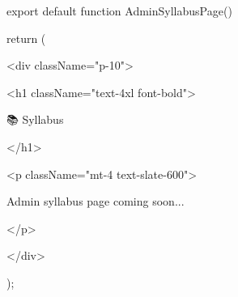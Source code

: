 export default function AdminSyllabusPage() {
  return (

    <div className="p-10">

      <h1 className="text-4xl font-bold">

        📚 Syllabus

      </h1>

      <p className="mt-4 text-slate-600">

        Admin syllabus page coming soon...

      </p>

    </div>

  );
}